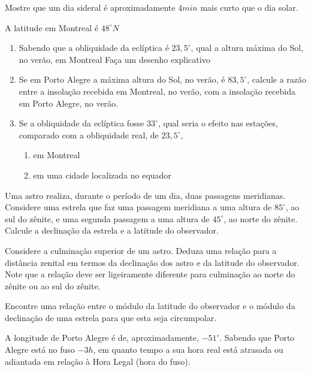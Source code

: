 \newpage
\begin{prob}
	Mostre que um dia sideral é aproximadamente $4min$ mais curto que o dia solar.
\end{prob}
\begin{prob}
	A latitude em Montreal é $48^{\circ}N$
	\begin{enumerate}[label=\alph *)]
		\item Sabendo que a obliquidade da eclíptica é $23,5^{\circ}$, qual a altura máxima do Sol, no verão, em Montreal Faça um desenho explicativo
		\item Se em Porto Alegre a máxima altura do Sol, no verão, é $83,5^{\circ}$, calcule a razão entre a insolação recebida em Montreal, no verão, com a insolação recebida em Porto Alegre, no	verão.
		\item Se a obliquidade da eclíptica fosse $33^{\circ}$, qual seria o efeito nas estações, comparado com a obliquidade real, de $23,5^{\circ}$,
		\begin{enumerate}[label=\alph{enumi}.\roman{enumii})]
			\item em Montreal
			\item em uma cidade localizada no equador
		\end{enumerate}				
	\end{enumerate}
\end{prob}
\begin{prob}
	Uma astro realiza, durante o período de um dia, duas passagens meridianas. Considere uma
	estrela que faz uma passagem meridiana a uma altura de $85^{\circ}$, ao sul do zênite, e uma segunda
	passagem a uma altura de $45^{\circ}$, ao norte do zênite. Calcule a declinação da estrela e a latitude do
	observador.
\end{prob}
\begin{prob}
	Considere a culminação superior de um astro. Deduza uma relação para a distância zenital em
	termos da declinação dos astro e da latitude do observador. Note que a relação deve ser ligeiramente
	diferente para culminação ao norte do zênite ou ao sul do zênite.
\end{prob}
\begin{prob}
	Encontre uma relação entre o módulo da latitude do observador e o módulo da declinação de
	uma estrela para que esta seja circumpolar.
\end{prob}
\begin{prob}
	A longitude de Porto Alegre é de, aproximadamente, $-51^{\circ}$. Sabendo que Porto Alegre está no
	fuso $-3h$, em quanto tempo a sua hora real está atrasada ou adiantada em relação à Hora Legal (hora
	do fuso).
\end{prob}